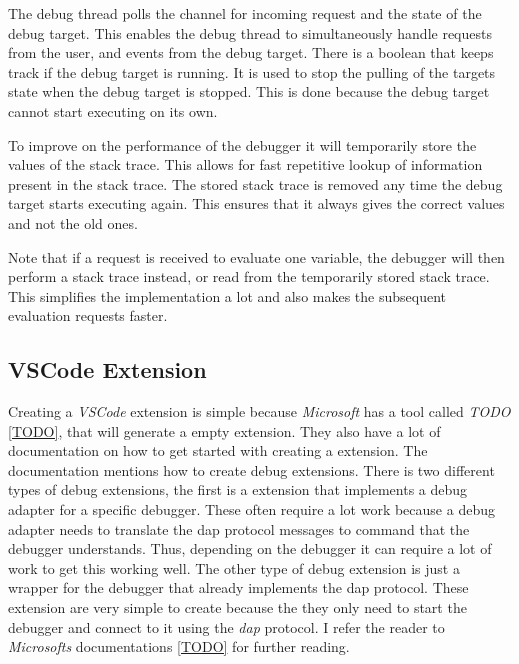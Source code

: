 The debug thread polls the channel for incoming request and the state of the debug target.
This enables the debug thread to simultaneously handle requests from the user, and events from the debug target.
There is a boolean that keeps track if the debug target is running.
It is used to stop the pulling of the targets state when the debug target is stopped.
This is done because the debug target cannot start executing on its own.


To improve on the performance of the debugger it will temporarily store the values of the stack trace.
This allows for fast repetitive lookup of information present in the stack trace.
The stored stack trace is removed any time the debug target starts executing again.
This ensures that it always gives the correct values and not the old ones.


Note that if a request is received to evaluate one variable, the debugger will then perform a stack trace instead, or read from the temporarily stored stack trace.
This simplifies the implementation a lot and also makes the subsequent evaluation requests faster.



\subsection{VSCode Extension}
Creating a \emph{VSCode} extension is simple because \emph{Microsoft} has a tool called \emph{TODO} \ref{TODO}, that will generate a empty extension.
They also have a lot of documentation on how to get started with creating a extension.
The documentation mentions how to create debug extensions.
There is two different types of debug extensions, the first is a extension that implements a debug adapter for a specific debugger.
These often require a lot work because a debug adapter needs to translate the \gls{dap} protocol messages to command that the debugger understands.
Thus, depending on the debugger it can require a lot of work to get this working well.
The other type of debug extension is just a wrapper for the debugger that already implements the \gls{dap} protocol.
These extension are very simple to create because the they only need to start the debugger and connect to it using the \emph{dap} protocol.
I refer the reader to \emph{Microsofts} documentations \ref{TODO} for further reading.


